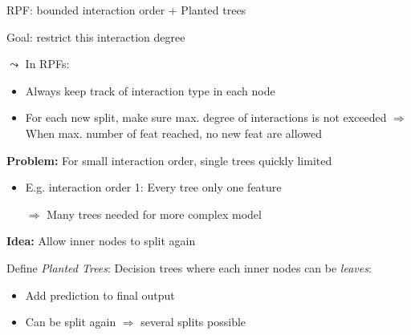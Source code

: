 \documentclass[10pt,compress,t,notes=noshow, xcolor=table]{beamer}
\begin{document}
\begin{frame}{RPF: bounded interaction order + Planted trees}

    Goal: restrict this interaction degree
    
    $\leadsto$ In RPFs: 

    \begin{itemize}
        \item Always keep track of interaction type in each node
        
        \item For each new split, make sure max. degree of interactions is not exceeded $\Rightarrow$ When max. number of feat reached, no new feat are allowed
    \end{itemize}

    \textbf{Problem: } For small interaction order, single trees quickly limited

    \begin{itemize}
        \item E.g. interaction order 1: Every tree only one feature
        \item[$\Rightarrow$] Many trees needed for more complex model
    \end{itemize}

    \textbf{Idea:} Allow inner nodes to split again

    Define \textit{Planted Trees}: Decision trees where each inner nodes can be \textit{leaves}:
    \begin{itemize}
        \item Add prediction to final output
        \item Can be split again $\Rightarrow$ several splits possible
    \end{itemize}
    
\end{frame}


\end{document}
